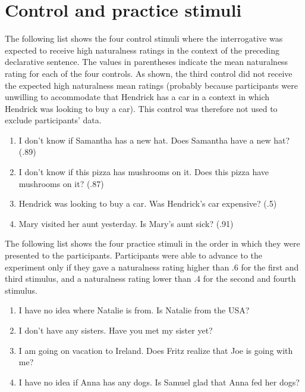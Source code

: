 \documentclass[11pt,fleqn]{article}
\newcommand{\6}{\mbox{$[\hspace*{-.6mm}[$}}
\newcommand{\9}{\mbox{$]\hspace*{-.6mm}]$}}
\begin{document}
\section{Control and practice stimuli}\label{a:fillerPractice}

The following list shows the four control stimuli where the interrogative was expected to receive high naturalness ratings in the context of the preceding declarative sentence. The values in parentheses indicate the mean naturalness rating for each of the four controls. As shown, the third control did not receive the expected high naturalness mean ratings (probably because participants were unwilling to accommodate that Hendrick has a car in a context in which Hendrick was looking to buy a car). This control was therefore not used to exclude participants' data. 

\begin{enumerate}[leftmargin=4ex,itemsep=-2pt]

\item I don't know if Samantha has a new hat. Does Samantha have a new hat? (.89)

\item  I don't know if this pizza has mushrooms on it. Does this pizza have mushrooms on it? (.87)

\item Hendrick was looking to buy a car. Was Hendrick's car expensive? (.5)

\item Mary visited her aunt yesterday. Is Mary's aunt sick? (.91)

\end{enumerate}

\noindent
The following list shows the four practice stimuli in the order in which they were presented to the participants. Participants were able to advance to the experiment only if they gave a naturalness rating higher than .6 for the first and third stimulus, and a naturalness rating lower than .4 for the second and fourth stimulus.

\begin{enumerate}[leftmargin=4ex,itemsep=-2pt]

\item I have no idea where Natalie is from. Is Natalie from the USA?

\item I don't have any sisters. Have you met my sister yet?

\item I am going on vacation to Ireland. Does Fritz realize that Joe is going with me?

\item I have no idea if Anna has any dogs. Is Samuel glad that Anna fed her dogs?

\end{enumerate}
\end{document}

